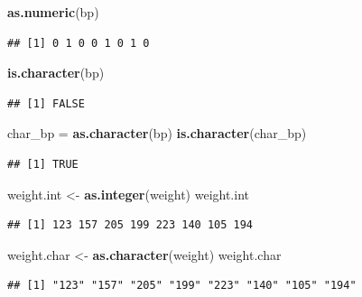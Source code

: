\documentclass[]{article}
\newenvironment{Shaded}{\begin{snugshade}}{\end{snugshade}}
\newcommand{\KeywordTok}[1]{\textcolor[rgb]{0.13,0.29,0.53}{\textbf{#1}}}
\newcommand{\StringTok}[1]{\textcolor[rgb]{0.31,0.60,0.02}{#1}}
\newcommand{\NormalTok}[1]{#1}
\begin{document}
\begin{Shaded}
\begin{Highlighting}[]
\KeywordTok{as.numeric}\NormalTok{(bp)}
\end{Highlighting}
\end{Shaded}

\begin{verbatim}
## [1] 0 1 0 0 1 0 1 0
\end{verbatim}

\begin{Shaded}
\begin{Highlighting}[]
\KeywordTok{is.character}\NormalTok{(bp)}
\end{Highlighting}
\end{Shaded}

\begin{verbatim}
## [1] FALSE
\end{verbatim}

\begin{Shaded}
\begin{Highlighting}[]
\NormalTok{char_bp =}\StringTok{ }\KeywordTok{as.character}\NormalTok{(bp)}
\KeywordTok{is.character}\NormalTok{(char_bp)}
\end{Highlighting}
\end{Shaded}

\begin{verbatim}
## [1] TRUE
\end{verbatim}

\begin{Shaded}
\begin{Highlighting}[]
\NormalTok{weight.int <-}\StringTok{ }\KeywordTok{as.integer}\NormalTok{(weight)}
\NormalTok{weight.int}
\end{Highlighting}
\end{Shaded}

\begin{verbatim}
## [1] 123 157 205 199 223 140 105 194
\end{verbatim}

\begin{Shaded}
\begin{Highlighting}[]
\NormalTok{weight.char <-}\StringTok{ }\KeywordTok{as.character}\NormalTok{(weight)}
\NormalTok{weight.char}
\end{Highlighting}
\end{Shaded}

\begin{verbatim}
## [1] "123" "157" "205" "199" "223" "140" "105" "194"
\end{verbatim}
\end{document}
